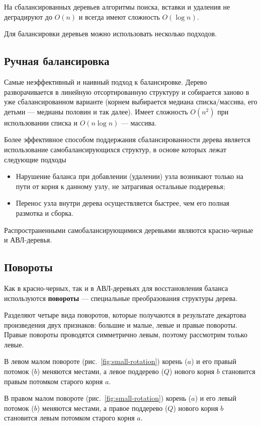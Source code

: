 На сбалансированных деревьев алгоритмы поиска, вставки и удаления не деградируют до $O(n)$
и всегда имеют сложность $O(\log n)$.

Для балансировки деревьев можно использовать несколько подходов.
\subsection{Ручная балансировка}
Самые неэффективный и наивный подход к балансировке. Дерево разворачивается
в линейную отсортированную структуру и собирается заново в уже сбалансированном варианте
(корнем выбирается медиана списка/массива, его детьми --- медианы половин и так далее).
Имеет сложность $O(n^2)$ при использовании списка и $O(n\log n)$ --- массива.

Более эффективное способом поддержания сбалансированности дерева является использование
самобалансирующихся структур, в основе которых лежат следующие подходы
\begin{itemize}
  \item Нарушение баланса при добавлении (удалении) узла возникают только на пути от корня к данному узлу,
  не затрагивая остальные поддеревья;
  \item Перенос узла внутри дерева осуществляется быстрее, чем его полная размотка и сборка.
\end{itemize}

Распространенными самобалансирующимися деревьями являются красно-черные и АВЛ-деревья.

\subsection{Повороты}
\label{sec:rotations}
Как в красно-черных, так и в АВЛ-деревьях для восстановления баланса используются
\textbf{повороты} --- специальные преобразования структуры дерева.

Разделяют четыре вида поворотов, которые получаются в результате декартова произведения двух признаков:
большие и малые, левые и правые повороты. Правые повороты проводятся симметрично левым, поэтому рассмотрим
только левые.

В левом малом повороте (рис.~\ref{fig:small-rotation}) корень ($a$) и его правый потомок ($b$)
меняются местами, а левое поддерево ($Q$) нового корня $b$ становится правым потомком старого корня $a$.

В правом малом повороте (рис.~\ref{fig:small-rotation}) корень ($a$) и его левый потомок ($b$)
меняются местами, а правое поддерево ($Q$) нового корня $b$ становится левым потомком старого корня $a$.

